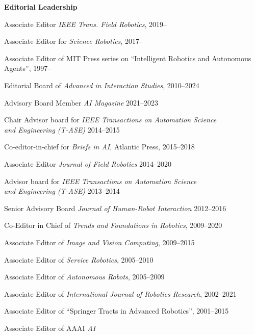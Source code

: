 \documentclass{article}
\begin{document}
\begin{cv}
	\begin{cvlist} {\bf Editorial Leadership}
		\item Associate Editor {\em IEEE Trans.\/ Field Robotics}, \cftdotfill{\cftdotsep} 2019--
		\item Associate Editor for {\em Science Robotics}, \cftdotfill{\cftdotsep} 2017--
		\item Associate Editor of MIT Press series on ``Intelligent Robotics and Autonomous\\ Agents'',\cftdotfill{\cftdotsep} 1997--
		\item Editorial Board of {\em Advanced in Interaction Studies},\cftdotfill{\cftdotsep} 2010--2024
		\item Advisory Board Member {\em AI Magazine}\@ \cftdotfill{\cftdotsep} 2021--2023
		\item Chair Advisor board for {\em IEEE Transactions on Automation
				Science\\ and Engineering (T-ASE)}  \cftdotfill{\cftdotsep} 2014--2015
		\item Co-editor-in-chief for {\em Briefs in AI}, Atlantic Press,
		\cftdotfill{\cftdotsep}  2015--2018
		\item Associate Editor {\em Journal of Field Robotics}
		\cftdotfill{\cftdotsep} 2014--2020
		\item Advisor board for {\em IEEE Transactions on Automation
				Science\\ and Engineering (T-ASE)} \cftdotfill{\cftdotsep} 2013--2014
		\item Senior Advisory Board {\em Journal of Human-Robot Interaction}
		\cftdotfill{\cftdotsep} 2012--2016
		\item Co-Editor in Chief of {\em Trends and Foundations in
				Robotics}, \cftdotfill{\cftdotsep} 2009--2020
		\item Associate Editor of {\em Image and Vision
				Computing},\cftdotfill{\cftdotsep} 2009--2015
		\item Associate Editor of {\em Service Robotics},
		\cftdotfill{\cftdotsep} 2005--2010
		\item Associate Editor of {\em Autonomous Robots},
		\cftdotfill{\cftdotsep} 2005--2009
		\item Associate Editor of {\em International Journal of Robotics
				Research},\cftdotfill{\cftdotsep} 2002--2021
		\item Associate Editor of ``Springer Tracts in Advanced
		Robotics'',\cftdotfill{\cftdotsep} 2001--2015
		\item Associate Editor of AAAI {\em AI
}
\end{cvlist}
\end{cv}
\end{document}
